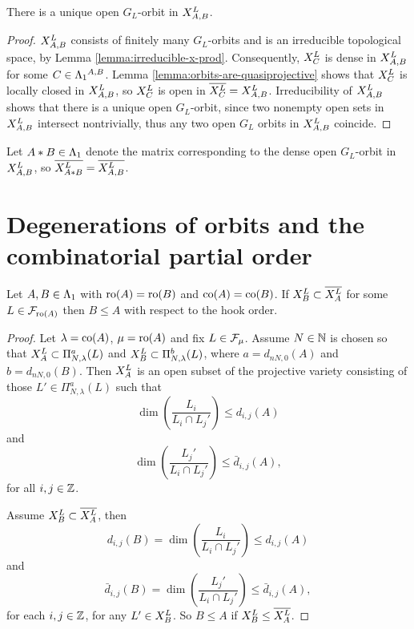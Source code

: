 \documentclass[a4paper, 11pt]{report}
\begin{document}
\begin{proposition}\label{prop:open-orbit-x-prod}
There is a unique open $G_L$-orbit in $\xprod[L]{A,B}$.
\end{proposition}

\begin{proof}
$\xprod[L]{A,B}$ consists of finitely many $G_L$-orbits and is an irreducible topological space, by Lemma \ref{lemma:irreducible-x-prod}. Consequently, $\xprod[L]{C}$ is dense in $\xprod[L]{A,B}$ for some $C\in\matrices^{A,B}$. Lemma \ref{lemma:orbits-are-quasiprojective} shows that $\xprod[L]{C}$ is locally closed in $\xprod[L]{A,B}$, so $\xprod[L]{C}$ is open in $\overline{\xprod[L]{C}}=\xprod[L]{A,B}$. Irreducibility of $\xprod[L]{A,B}$ shows that there is a unique open $G_L$-orbit, since two nonempty open sets in $\xprod[L]{A,B}$ intersect nontrivially, thus any two open $G_L$ orbits in $\xprod[L]{A,B}$ coincide.
\end{proof}

Let $A\ast B\in\matrices$ denote the matrix corresponding to the dense open $G_L$-orbit in $\xprod[L]{A,B}$, so $\overline{\xprod[L]{A\ast B}}=\overline{\xprod[L]{A,B}}$.

\section{Degenerations of orbits and the combinatorial partial order}

\begin{proposition}\label{proposition:compare-partial-orders}
Let $A,B\in\matrices$ with $\ro{A}=\ro{B}$ and $\co{A}=\co{B}$. If $\xprod[L]{B}\subset\overline{\xprod[L]{A}}$ for some $L\in\flags_{\ro{A}}$ then $B\le A$ with respect to the hook order.
\end{proposition}

\begin{proof}
Let $\lambda=\co{A}$, $\mu=\ro{A}$ and fix $L\in\flags_\mu$. Assume $N\in\naturals$ is chosen so that $\xprod[L]{A}\subset\Pi_{N,\lambda}^a(L)$ and $\xprod[L]{B}\subset\Pi_{N,\lambda}^b(L)$, where $a=d_{nN,0}{(A)}$ and $b=d_{nN,0}{(B)}$. Then $\xprod[L]{A}$ is an open subset of the projective variety consisting of those $L'\in\Pi_{N,\lambda}^a(L)$ such that
\begin{equation*}
\dim\left(\frac{L_i}{L_i\cap L_j'}\right)\le d_{i,j}{(A)}
\end{equation*}
and
\begin{equation*}
\dim\left(\frac{L_j'}{L_i\cap L_j'}\right)\le\bar{d}_{i,j}{(A)},
\end{equation*}
for all $i,j\in\integers$.

Assume $\xprod[L]{B}\subset \overline{\xprod[L]{A}}$, then
\begin{equation*}
d_{i,j}{(B)} = \dim\left(\frac{L_i}{L_i\cap L_j'}\right) \le d_{i,j}{(A)}
\end{equation*}
and
\begin{equation*}
\bar{d}_{i,j}{(B)} = \dim\left(\frac{L_j'}{L_i\cap L_j'}\right) \le \bar{d}_{i,j}{(A)},
\end{equation*}
for each $i,j\in\integers$, for any $L'\in\xprod[L]{B}$. So $B\le A$ if $\xprod[L]{B}\le\overline{\xprod[L]{A}}$.
\end{proof}
\end{document}

